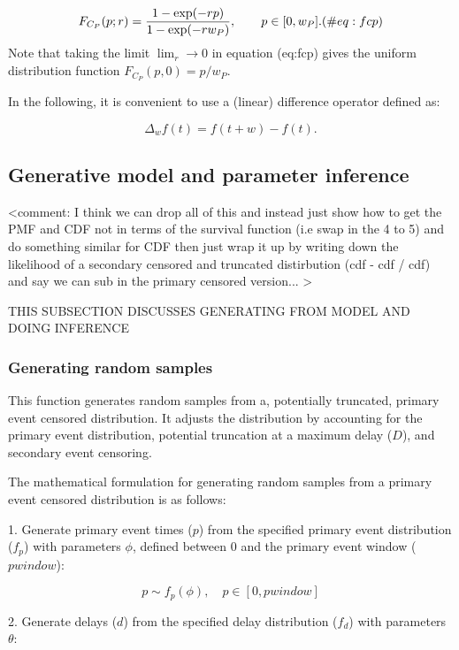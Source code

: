 \documentclass[10pt,letterpaper]{article}
\begin{document}
\begin{equation}
F_{C_P}(p; r) = {  1 - \exp(-r p) \over 1 - \exp(-r w_P)}, \qquad p \in [0, w_P]. (\#eq:fcp)
\end{equation}
Note that taking the limit $\lim_r \rightarrow 0$ in equation \@ref(eq:fcp) gives the uniform distribution function $F_{C_P}(p, 0) = p / w_P$.

In the following, it is convenient to use a (linear) difference operator defined as:

\begin{equation}
\Delta_{w}f(t) = f(t + w) - f(t).
\end{equation}

\subsection{Generative model and parameter inference}

<comment: I think we can drop all of this and instead just show how to get the PMF and CDF not in terms of the survival function (i.e swap in the 4 to 5) and do something similar for CDF then just wrap it up by writing down the likelihood of a secondary censored and truncated distirbution (cdf - cdf / cdf) and say we can sub in the primary censored version... >

THIS SUBSECTION DISCUSSES GENERATING FROM MODEL AND DOING INFERENCE 
\subsubsection{Generating random samples}
This function generates random samples from a, potentially truncated, primary event censored distribution. It adjusts the distribution by accounting for the primary event distribution, potential truncation at a maximum delay ($D$), and secondary event censoring.

The mathematical formulation for generating random samples from a primary event censored distribution is as follows:

1. Generate primary event times ($p$) from the specified primary event distribution ($f_p$) with parameters $\phi$, defined between 0 and the primary event window ($pwindow$):

\begin{equation}p \sim f_p(\phi), \quad p \in [0, pwindow]\end{equation}

2. Generate delays ($d$) from the specified delay distribution ($f_d$) with parameters $\theta$:
\end{document}
